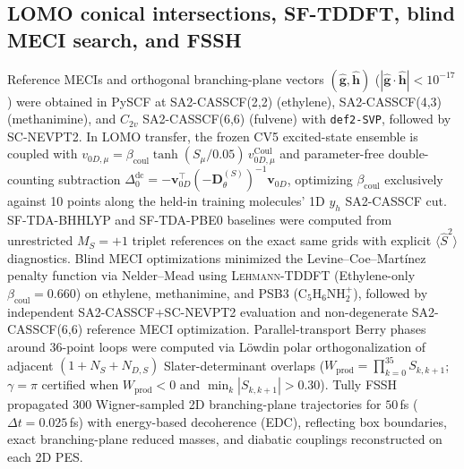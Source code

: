 \documentclass[10pt,twocolumn]{article}
\theoremstyle{natthm}
\newcommand{\leh}{\textsc{Lehmann-TDDFT}}
\newcommand{\Ssq}{\langle\hat{S}^2\rangle}
\begin{document}
\subsection*{LOMO conical intersections, SF-TDDFT, blind MECI search, and FSSH}
Reference MECIs and orthogonal branching-plane vectors $(\hat{\mathbf{g}},\hat{\mathbf{h}})$ ($|\hat{\mathbf{g}}\cdot\hat{\mathbf{h}}|<10^{-17}$) were obtained in PySCF at SA2-CASSCF(2,2) (ethylene), SA2-CASSCF(4,3) (methanimine), and $C_{2v}$ SA2-CASSCF(6,6) (fulvene) with \texttt{def2-SVP}, followed by SC-NEVPT2\cite{angeli2001nevpt2}.
In LOMO transfer, the frozen CV5 excited-state ensemble is coupled with $v_{0D,\mu}=\beta_{\mathrm{coul}}\tanh(S_\mu/0.05)\,v_{0D,\mu}^{\mathrm{Coul}}$ and parameter-free double-counting subtraction $\Delta_0^{\mathrm{dc}}=-\mathbf{v}_{0D}^\top(-\mathbf{D}_\theta^{(S)})^{-1}\mathbf{v}_{0D}$, optimizing $\beta_{\mathrm{coul}}$ exclusively against 10 points along the held-in training molecules' 1D $y_h$ SA2-CASSCF cut.
SF-TDA-BHHLYP and SF-TDA-PBE0 baselines\cite{shao2003sftddft} were computed from unrestricted $M_S=+1$ triplet references on the exact same grids with explicit $\Ssq$ diagnostics.
Blind MECI optimizations minimized the Levine--Coe--Mart\'inez penalty function\cite{levine2007} via Nelder--Mead using \leh{} (Ethylene-only $\beta_{\mathrm{coul}}=0.660$) on ethylene, methanimine, and PSB3 ($\mathrm{C}_5\mathrm{H}_6\mathrm{NH}_2^+$), followed by independent SA2-CASSCF+SC-NEVPT2 evaluation and non-degenerate SA2-CASSCF(6,6) reference MECI optimization.
Parallel-transport Berry phases around 36-point loops were computed via L\"owdin polar orthogonalization of adjacent $(1+N_S+N_{D,S})$ Slater-determinant overlaps ($W_{\mathrm{prod}}=\prod_{k=0}^{35}S_{k,k+1}$; $\gamma=\pi$ certified when $W_{\mathrm{prod}}<0$ and $\min_k|S_{k,k+1}|>0.30$).
Tully FSSH\cite{tully1990fssh} propagated 300 Wigner-sampled 2D branching-plane trajectories for $50$\,fs ($\Delta t=0.025$\,fs) with energy-based decoherence (EDC), reflecting box boundaries, exact branching-plane reduced masses, and diabatic couplings reconstructed on each 2D PES.
\end{document}
